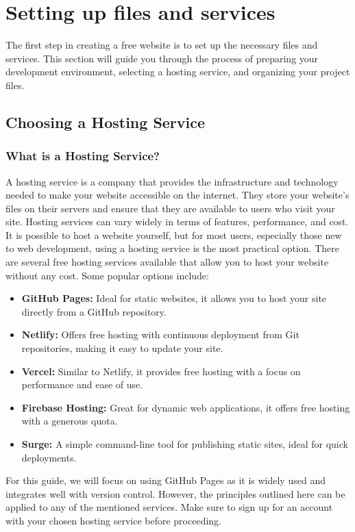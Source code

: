 \section{Setting up files and services}

The first step in creating a free website is to set up the necessary files and services. This section will guide you through the process of preparing your development environment, selecting a hosting service, and organizing your project files.

\subsection{Choosing a Hosting Service}

\subsubsection{What is a Hosting Service?}
A hosting service is a company that provides the infrastructure and technology needed to make your website accessible on the internet. They store your website's files on their servers and ensure that they are available to users who visit your site. Hosting services can vary widely in terms of features, performance, and cost. It is possible to host a website yourself, but for most users, especially those new to web development, using a hosting service is the most practical option. There are several free hosting services available that allow you to host your website without any cost. Some popular options include:
\begin{itemize}
    \item \textbf{GitHub Pages:} Ideal for static websites, it allows you to host your site directly from a GitHub repository.
    \item \textbf{Netlify:} Offers free hosting with continuous deployment from Git repositories, making it easy to update your site.
    \item \textbf{Vercel:} Similar to Netlify, it provides free hosting with a focus on performance and ease of use.
    \item \textbf{Firebase Hosting:} Great for dynamic web applications, it offers free hosting with a generous quota.
    \item \textbf{Surge:} A simple command-line tool for publishing static sites, ideal for quick deployments.
\end{itemize}

For this guide, we will focus on using GitHub Pages as it is widely used and integrates well with version control. However, the principles outlined here can be applied to any of the mentioned services. Make sure to sign up for an account with your chosen hosting service before proceeding.

